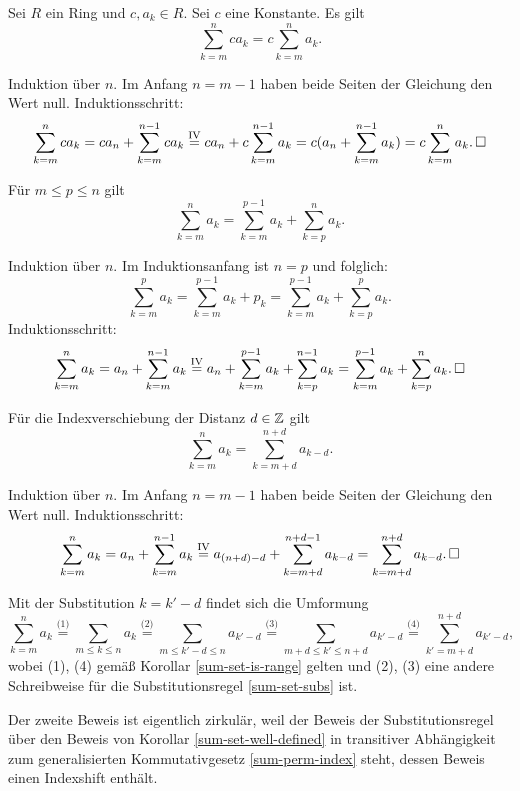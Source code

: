 \begin{Korollar}\label{sum-scale}
Sei $R$ ein Ring und $c,a_k\in R$. Sei $c$ eine
Konstante. Es gilt
\[\sum_{k=m}^n ca_k = c\sum_{k=m}^n a_k.\]
\end{Korollar}
\begin{Beweis} Induktion über $n$. Im Anfang $n=m-1$ haben beide
Seiten der Gleichung den Wert null. Induktionsschritt:
\[\sum_{k=m}^n ca_k = ca_n + \sum_{k=m}^{n-1} ca_k
\stackrel{\mathrm{IV}}= ca_n + c\sum_{k=m}^{n-1} a_k
= c(a_n + \sum_{k=m}^{n-1} a_k) = c\sum_{k=m}^n a_k.\,\square\]
\end{Beweis}

\begin{Korollar}\label{sum-split}
Für $m\le p\le n$ gilt
\[\sum_{k=m}^n a_k = \sum_{k=m}^{p-1} a_k + \sum_{k=p}^n a_k.\]
\end{Korollar}
\begin{Beweis} Induktion über $n$. Im Induktionsanfang ist $n=p$
und folglich:
\[\sum_{k=m}^p a_k = \sum_{k=m}^{p-1} a_k + p_k
= \sum_{k=m}^{p-1} a_k + \sum_{k=p}^p a_k.\]
Induktionsschritt:
\[\sum_{k=m}^n a_k = a_n + \sum_{k=m}^{n-1} a_k
\stackrel{\mathrm{IV}}= a_n + \sum_{k=m}^{p-1} a_k + \sum_{k=p}^{n-1} a_k
= \sum_{k=m}^{p-1} a_k + \sum_{k=p}^n a_k.\,\square\]
\end{Beweis}

\begin{Korollar}[Indexshift]\label{sum-indexshift}\newlinefirst
Für die Indexverschiebung der Distanz $d\in\mathbb Z$ gilt
\[\textstyle\sum_{k=m}^n a_k = \sum_{k=m+d}^{n+d} a_{k-d}.\]
\end{Korollar}
\begin{Beweis}[Beweis 1]
Induktion über $n$. Im Anfang $n = m-1$ haben beide Seiten
der Gleichung den Wert null. Induktionsschritt:
\[\sum_{k=m}^n a_k = a_n+\sum_{k=m}^{n-1}a_k \stackrel{\mathrm{IV}}=
a_{(n+d)-d}+\sum_{k=m+d}^{n+d-1}a_{k-d}
= \sum_{k=m+d}^{n+d}a_{k-d}.\,\square\]
\end{Beweis}
\begin{Beweis}[Beweis 2]
Mit der Substitution $k=k'-d$ findet sich die Umformung
\[\sum_{k=m}^n a_k \stackrel{\text{(1)}}= \sum_{m\le k\le n} a_k
\stackrel{\text{(2)}}= \sum_{m\le k'-d\le n} a_{k'-d}
\stackrel{\text{(3)}}= \sum_{m+d\le k'\le n+d} a_{k'-d}
\stackrel{\text{(4)}}= \sum_{k'=m+d}^{n+d} a_{k'-d},\]
wobei (1), (4) gemäß Korollar \ref{sum-set-is-range} gelten
und (2), (3) eine andere Schreibweise für die Substitutionsregel
\ref{sum-set-subs} ist.\,\qedsymbol
\end{Beweis}
 Der zweite Beweis ist eigentlich zirkulär,
weil der Beweis der Substitutionsregel über den Beweis von
Korollar \ref{sum-set-well-defined} in transitiver Abhängigkeit zum
generalisierten Kommutativgesetz \ref{sum-perm-index} steht, dessen
Beweis einen Indexshift enthält.

